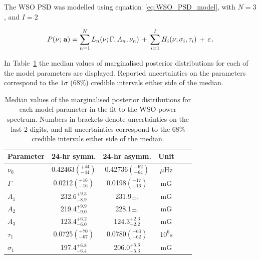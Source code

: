 The WSO PSD was modelled using equation~\ref{eq:WSO_PSD_model}, with $N=3$, and $I=2$

\begin{equation}
P(\nu; \,{\bf a}) = \sum_{n=1}^{N} L_n(\nu; \Gamma, A_n, \nu_n) \, + \, \sum_{i=1}^{I} H_i(\nu; \sigma_i, \tau_i) \, + \, c \, .
\label{eq:WSO_PSD_model}
\end{equation}


In Table~\ref{tab:WSO_SMMF_fit_params} the median values of marginalised posterior distributions for each of the model parameters are displayed. Reported uncertainties on the parameters correspond to the $1\sigma$ ($68 \%$) credible intervals either side of the median. 

\begin{table}[ht!]
	\begin{center}
		\caption{Median values of the marginalised posterior distributions for each model parameter in the fit to the WSO power spectrum. Numbers in brackets denote uncertainties on the last 2 digits, and all uncertainties correspond to the $68 \%$ credible intervals either side of the median.}\label{tab:WSO_SMMF_fit_params}
		\begin{tabular}{l c c c c r}
			\hline
			{Parameter} & {24-hr symm.} & {24-hr asymm.} & {Unit} \\
			\hline
			
			{$\nu_0$} & {0.42463$\left(_{-44}^{+44}\right)$} & {0.42736$\left(_{-64}^{+62}\right)$} & {$\mu\mathrm{Hz} $}\\
			
			{$\Gamma$} & {0.0212$\left(_{-16}^{+16}\right)$} & {0.0198$\left(_{-16}^{+17}\right)$} & {$\mathrm{mG}$} \\
			
			{$A_1$} & {232.6$_{-8.9}^{+9.3}$} & {231.9${\pm .}$} & {$\mathrm{mG}$} \\
			
			{$A_2$} & {219.4$_{-9.0}^{+9.9}$} & {228.1${\pm .}$} & {$\mathrm{mG}$} \\
			
			{$A_3$} & {123.4$_{-6.0}^{+6.2}$} & {124.3$_{-2.2}^{+2.3}$} & {$\mathrm{mG}$} \\
			
			{$\tau_1$} & {0.0725$\left(_{-67}^{+70}\right)$} & {0.0780$\left(_{-62}^{+63}\right)$} & {$10^6 \mathrm{s}$} \\	
			
			{$\sigma_1$} & {197.4$_{-6.4}^{+6.8}$} & {206.0$_{-5.3}^{+5.6}$} & {$\mathrm{mG}$} \\	
			

\end{tabular}
\end{center}
\end{table}
